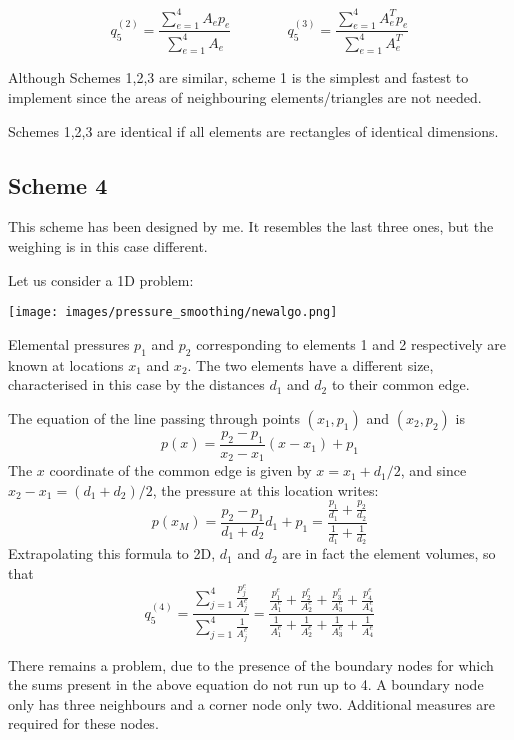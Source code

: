 \[
q_5^{(2)} = \frac{\sum\limits_{e=1}^4 A_e p_e}{\sum\limits_{e=1}^4 A_e}
\qquad
\qquad
q_5^{(3)} = \frac{\sum\limits_{e=1}^4 A_e^T p_e}{\sum\limits_{e=1}^4 A_e^T}
\] 


\begin{remark} Although Schemes 1,2,3 are similar, scheme 1 is the simplest and fastest
to implement since the areas of neighbouring elements/triangles are not needed.
\end{remark}

\begin{remark} 
Schemes 1,2,3 are identical if all elements are rectangles of identical dimensions.
\end{remark}




\subsection{Scheme 4} 

This scheme has been designed by me. 
It resembles the last three ones, but the weighing is in this case different.

Let us consider a 1D problem:
\begin{center}
\texttt{[image: images/pressure\_smoothing/newalgo.png]}
\end{center}

Elemental pressures $p_1$ and $p_2$ corresponding to elements 1 and 2 respectively are known at
locations $x_1$ and $x_2$. The two elements have a different size, characterised in this case
by the distances $d_1$ and $d_2$ to their common edge.

The equation of the line passing through points $(x_1,p_1)$ and $(x_2,p_2)$ is 
\[
p(x)=\frac{p_2-p_1}{x_2-x_1}(x-x_1)+p_1
\]
The $x$ coordinate of the common edge is given by $x=x_1+d_1/2$, 
and since $x_2-x_1=(d_1+d_2)/2$, the 
pressure at this location writes:
\[
p(x_M)= \frac{p_2-p_1}{d_1+d_2}d_1+p_1 = \frac{\frac{p_1}{d_1} + \frac{p_2}{d_2}}{\frac{1}{d_1} + \frac{1}{d_2}}
\]
Extrapolating this formula to 2D, $d_1$ and $d_2$ are in fact the element volumes, so that
\[
q_5^{(4)} = 
\frac{\sum\limits_{j=1}^4 \frac{p_j^e}{A_j^e}}{\sum\limits_{j=1}^4 \frac{1}{A_j^e}}
=
\frac{
\frac{p_1^e}{A_1^e}+
\frac{p_2^e}{A_2^e}+
\frac{p_3^e}{A_3^e}+
\frac{p_4^e}{A_4^e}
}{
\frac{1}{A_1^e}+
\frac{1}{A_2^e}+
\frac{1}{A_3^e}+
\frac{1}{A_4^e}
}\]

There remains a problem, due to the presence of the boundary nodes for which 
the sums present in the above equation do not run up to 4. A boundary
node only has three neighbours and a corner node only two. Additional measures
are required for these nodes. 

